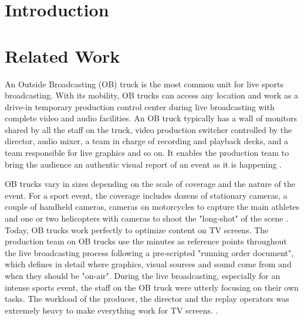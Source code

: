 \documentclass[sigchi-a, authorversion]{acmart}
\begin{document}


\begin{abstract}
    \ldots
\end{abstract}





\maketitle

\section{Introduction}

\section{Related Work}

An Outside Broadcasting (OB) truck is the most common unit for live sports broadcasting. With its mobility, OB trucks can access any location and work as a drive-in temporary production control center during live broadcasting with complete video and audio facilities. An OB truck typically has a wall of monitors shared by all the staff on the truck, video production switcher controlled by the director, audio mixer, a team in charge of recording and playback decks, and a team responsible for live graphics and so on. It enables the production team to bring the audience an authentic visual report of an event as it is happening \cite{owens2012, owens2015}.

OB trucks vary in sizes depending on the scale of coverage and the nature of the event. For a sport event, the coverage includes dozens of stationary cameras, a couple of handheld cameras, cameras on motorcycles to capture the main athletes and one or two helicopters with cameras to shoot the "long-shot" of the scene \cite{owens2012, li2018}. Today, OB trucks work perfectly to optimize content on TV screens. The production team on OB trucks use the minutes as reference points throughout the live broadcasting process following a pre-scripted "running order document", which defines in detail where graphics, visual sources and sound come from and when they should be "on-air". During the live broadcasting, especially for an intense sports event, the staff on the OB truck were utterly focusing on their own tasks. The workload of the producer, the director and the replay operators was extremely heavy to make everything work for TV screens.
 \cite{li2018}. 
 
\end{document}
